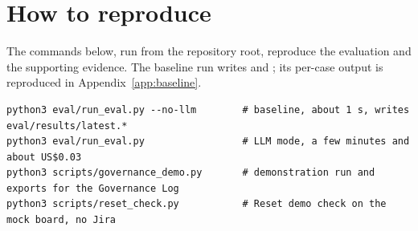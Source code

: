 \chapter{How to reproduce}
\label{ch:reproduce}

The commands below, run from the repository root, reproduce the evaluation and the supporting evidence. The baseline run writes  and ; its per-case output is reproduced in Appendix~\ref{app:baseline}.

\begin{lstlisting}[numbers=none]
python3 eval/run_eval.py --no-llm        # baseline, about 1 s, writes eval/results/latest.*
python3 eval/run_eval.py                 # LLM mode, a few minutes and about US$0.03
python3 scripts/governance_demo.py       # demonstration run and exports for the Governance Log
python3 scripts/reset_check.py           # Reset demo check on the mock board, no Jira
\end{lstlisting}
